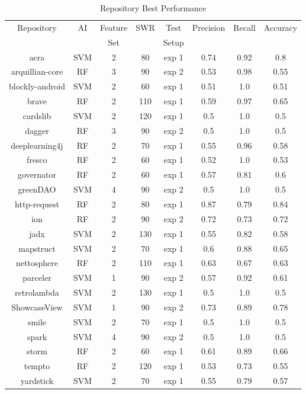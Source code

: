 \begin{table}
\begin{center}
    \begin{tabular}{|c||c|c|c|c||c|c|c|}
        \hline
        Repository & AI & Feature & SWR & Test & Precision & Recall & Accuracy \\
         & & Set & & Setup & & & \\
        \hline
        acra & SVM & 2 & 80 & exp 1 & 0.74 & 0.92 & 0.8 \\          %
        arquillian-core & RF & 3 & 90 & exp 2 & 0.53 & 0.98 & 0.55 \\
        blockly-android & SVM & 2 & 60 & exp 1 & 0.51 & 1.0 & 0.51 \\
        brave & RF & 2 & 110 & exp 1 & 0.59 & 0.97 & 0.65 \\
        cardslib & SVM & 2 & 120 & exp 1 & 0.5 & 1.0 & 0.5 \\
        dagger & RF & 3 & 90 & exp 2 & 0.5 & 1.0 & 0.5 \\
        deeplearning4j & RF & 2 & 70 & exp 1 & 0.55 & 0.96 & 0.58 \\
        fresco & RF & 2 & 60 & exp 1 & 0.52 & 1.0 & 0.53 \\
        governator & RF & 2 & 60 & exp 1 & 0.57 & 0.81 & 0.6 \\
        greenDAO & SVM & 4 & 90 & exp 2 & 0.5 & 1.0 & 0.5 \\
        http-request & RF & 2 & 80 & exp 1 & 0.87 & 0.79 & 0.84 \\   %
        ion & RF & 2 & 90 & exp 2 & 0.72 & 0.73 & 0.72 \\            %
        jadx & SVM & 2 & 130 & exp 1 & 0.55 & 0.82 & 0.58 \\
        mapstruct & SVM & 2 & 70 & exp 1 & 0.6 & 0.88 & 0.65 \\
        nettosphere & RF & 2 & 110 & exp 1 & 0.63 & 0.67 & 0.63 \\
        parceler & SVM & 1 & 90 & exp 2 & 0.57 & 0.92 & 0.61 \\
        retrolambda & SVM & 2 & 130 & exp 1 & 0.5 & 1.0 & 0.5 \\
        ShowcaseView & SVM & 1 & 90 & exp 2 & 0.73 & 0.89 & 0.78 \\  %
        smile & SVM & 2 & 70 & exp 1 & 0.5 & 1.0 & 0.5 \\
        spark & SVM & 4 & 90 & exp 2 & 0.5 & 1.0 & 0.5 \\
        storm & RF & 2 & 60 & exp 1 & 0.61 & 0.89 & 0.66 \\
        tempto & RF & 2 & 120 & exp 1 & 0.53 & 0.73 & 0.55 \\
        yardstick & SVM & 2 & 70 & exp 1 & 0.55 & 0.79 & 0.57 \\
        \hline
    \end{tabular}
\end{center}
\caption{Repository Best Performance}
\label{tab:repository_performance}
\end{table}

